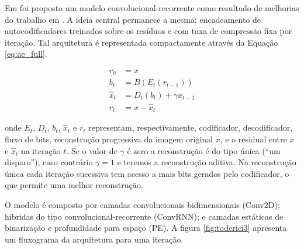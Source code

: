 
Em \cite{FullResolution2017Toderici} foi proposto um modelo convolucional-recorrente como resultado de melhorias do trabalho em \cite {Variable2016Toderici}. A ideia central permanece a mesma: encadeamento de autocodificadores treinados sobre os resíduos e com taxa de compressão fixa por iteração.  Tal arquitetura é representada compactamente através da Equação \ref{eq:ae_full}. 

\begin{equation}
\label{eq:ae_full}
\begin{aligned}
r_{0} &=x\\
b_{t} &= B(E_{t}(r_{t-1})) \\
\hat{x}_{t} &= D_{t}(b_{t}) + \gamma \hat{x}_{t-1} \\
r_{t} &= x- \hat{x}_{t}
\end{aligned}
\end{equation}

onde $E_t$, $D_t$, $b_t$, $\hat{x}_t$ e $r_t$ representam, respectivamente, codificador, decodificador, fluxo de bits, reconstrução progressiva da imagem original $x$, e o residual entre $x$ e $\hat{x}_t$ na iteração $t$. Se o valor de $\gamma$ é zero a reconstrução é do tipo única (``um disparo''), caso contrário $\gamma = 1$  e teremos a reconstrução aditiva. Na reconstrução única cada iteração sucessiva tem acesso a mais bits gerados pelo codificador, o que permite uma melhor reconstrução. 


O modelo é composto por camadas convolucionais bidimensionais (Conv2D); hibridas do tipo convolucional-recorrente (ConvRNN); e camadas estáticas de binarização e profundidade para espaço (PE). A figura \ref{fig:toderici3} apresenta um fluxograma da arquitetura para uma iteração.


